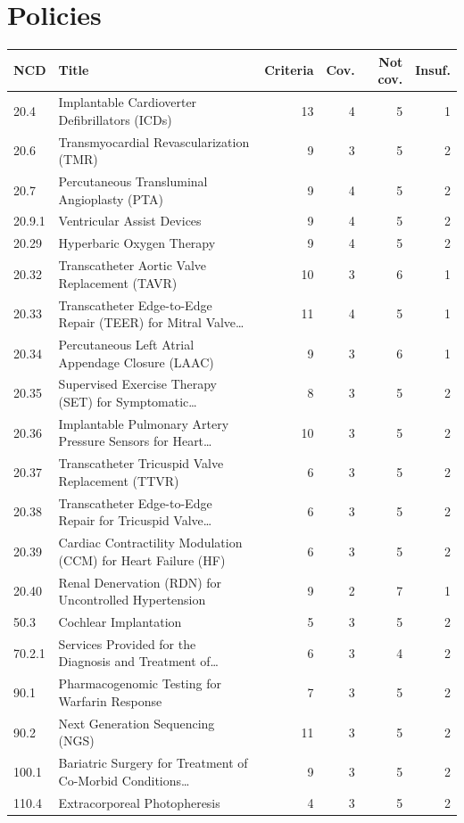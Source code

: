 \documentclass[11pt]{article}
\begin{document}
\section{Policies}
\label{app:policies}
\small
\begin{longtable}{llrrrr}
\toprule
NCD & Title & Criteria & Cov. & Not cov. & Insuf. \\
\midrule
\endhead
20.4 & Implantable Cardioverter Defibrillators (ICDs) & 13 & 4 & 5 & 1 \\
20.6 & Transmyocardial Revascularization (TMR) & 9 & 3 & 5 & 2 \\
20.7 & Percutaneous Transluminal Angioplasty (PTA) & 9 & 4 & 5 & 2 \\
20.9.1 & Ventricular Assist Devices & 9 & 4 & 5 & 2 \\
20.29 & Hyperbaric Oxygen Therapy & 9 & 4 & 5 & 2 \\
20.32 & Transcatheter Aortic Valve Replacement (TAVR) & 10 & 3 & 6 & 1 \\
20.33 & Transcatheter Edge-to-Edge Repair (TEER) for Mitral Valve\ldots & 11 & 4 & 5 & 1 \\
20.34 & Percutaneous Left Atrial Appendage Closure (LAAC) & 9 & 3 & 6 & 1 \\
20.35 & Supervised Exercise Therapy (SET) for Symptomatic\ldots & 8 & 3 & 5 & 2 \\
20.36 & Implantable Pulmonary Artery Pressure Sensors for Heart\ldots & 10 & 3 & 5 & 2 \\
20.37 & Transcatheter Tricuspid Valve Replacement (TTVR) & 6 & 3 & 5 & 2 \\
20.38 & Transcatheter Edge-to-Edge Repair for Tricuspid Valve\ldots & 6 & 3 & 5 & 2 \\
20.39 & Cardiac Contractility Modulation (CCM) for Heart Failure (HF) & 6 & 3 & 5 & 2 \\
20.40 & Renal Denervation (RDN) for Uncontrolled Hypertension & 9 & 2 & 7 & 1 \\
50.3 & Cochlear Implantation & 5 & 3 & 5 & 2 \\
70.2.1 & Services Provided for the Diagnosis and Treatment of\ldots & 6 & 3 & 4 & 2 \\
90.1 & Pharmacogenomic Testing for Warfarin Response & 7 & 3 & 5 & 2 \\
90.2 & Next Generation Sequencing (NGS) & 11 & 3 & 5 & 2 \\
100.1 & Bariatric Surgery for Treatment of Co-Morbid Conditions\ldots & 9 & 3 & 5 & 2 \\
110.4 & Extracorporeal Photopheresis & 4 & 3 & 5 & 2 \\

\end{longtable}
\end{document}
